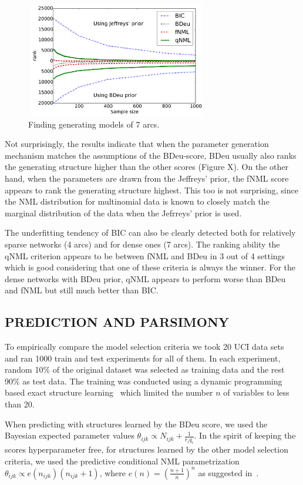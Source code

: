 \begin{figure}[h]
\centering
\includegraphics[width=8cm,height=5cm]{qNML_images/art7_mean.pdf}
\caption{Finding generating models of 7 arcs.}
\label{fig:4arcs}
\end{figure}


Not surprisingly, the results indicate that when the parameter generation
mechanism matches the assumptions of the BDeu-score, BDeu usually
also ranks the generating structure higher than the other scores
(Figure X).  On the other hand, when the parameters are drawn from the
Jeffreys' prior, the fNML score appears to rank the generating structure
highest. This too is not surprising, since the NML distribution for
multinomial data is known to closely match the marginal distribution of
the data when the Jefrreys' prior is used.

The underfitting tendency of BIC can also be clearly detected both for
relatively sparse networks (4 arcs) and for dense ones (7 arcs). The
ranking ability the qNML criterion appears to be between fNML and BDeu
in 3 out of 4 settings which is good considering that one of these
criteria is always the winner. For the dense networks with BDeu prior,
qNML appears to perform worse than BDeu and fNML but still much
better than BIC.

\subsection{PREDICTION AND PARSIMONY}

To empirically compare the model selection criteria we took 20 UCI
data sets~\cite{Lichman:2013} and ran 1000 train and test experiments
for all of them. In each experiment, random 10\% of the original
dataset was selected as training data and the rest 90\% as test data.
The training was conducted using a dynamic programming based exact structure
learning~\cite{cosco.uai06} which limited the number $n$ of variables
to less than 20.

When predicting with structures learned by the BDeu score, we used the
Bayesian expected parameter values $\theta_{ijk} \propto
N_{ijk}+\frac{1}{r_iq_i}$.  In the spirit of keeping the scores
hyperparameter free, for structures learned by the other model
selection criteria, we used the predictive conditional NML
parametrization $\theta_{ijk}\propto e(n_{ijk})(n_{ijk}+1)$, where
$e(n)=(\frac{n+1}{n})^n$ as suggested in~\cite{Riss07b}.

